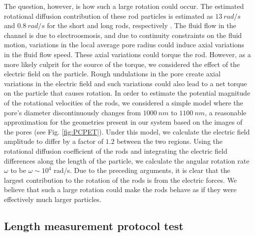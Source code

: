 			The question, however, is how such a large rotation could occur. The estimated rotational diffusion contribution of these rod particles is estimated as $\SI{13}{rad/s}$ and $\SI{0.8}{rad/s}$ for the short and long rods, respectively \cite{Tirado1980}. The fluid flow in the channel is due to electroosmosis, and due to continuity constraints on the fluid motion, variations in the local average pore radius could induce axial variations in the fluid flow speed. These axial variations could torque the rod. However, as a more likely culprit for the source of the torque, we considered the effect of the electric field on the particle. Rough undulations in the pore create axial variations in the electric field and such variations could also lead to a net torque on the particle that causes rotation. In order to estimate the potential magnitude of the rotational velocities of the rods, we considered a simple model where the pore's diameter discontinuously changes from $\SI{1000}{nm}$ to $\SI{1100}{nm}$, a reasonable approximation for the geometries present in our system based on the images of the pores (see Fig. \ref{fig:PCPET}). Under this model, we calculate the electric field amplitude to differ by a factor of $1.2$ between the two regions. Using the rotational diffusion coefficient of the rods and integrating the electric field differences along the length of the particle, we calculate the angular rotation rate $\omega$ to be $\omega\sim10^{4}$ rad/s. Due to the preceding arguments, it is clear that the largest contribution to the rotation of the rods is from the electric forces. We believe that such a large rotation could make the rods behave as if they were effectively much larger particles.
		
		\subsection{Length measurement protocol test}
		

